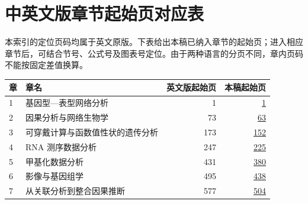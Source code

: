 
\clearpage
{}
\section*{中英文版章节起始页对应表}
本索引的定位页码均属于英文原版。下表给出本稿已纳入章节的起始页；进入相应章节后，可结合节号、公式号及图表号定位。由于两种语言的分页不同，章内页码不能按固定差值换算。

\begin{center}
\small
\begin{tabularx}{\linewidth}{@{}lXrr@{}}
\toprule
章 & 章名 & 英文版起始页 & 本稿起始页\\
\midrule
1 & 基因型—表型网络分析 & 1 & \hyperlink{chapter.1}{1}\\
2 & 因果分析与网络生物学 & 73 & \hyperlink{chapter.2}{63}\\
3 & 可穿戴计算与函数值性状的遗传分析 & 173 & \hyperlink{chapter.3}{152}\\
4 & RNA 测序数据分析 & 247 & \hyperlink{chapter.4}{225}\\
5 & 甲基化数据分析 & 431 & \hyperlink{chapter.5}{380}\\
6 & 影像与基因组学 & 495 & \hyperlink{chapter.6}{438}\\
7 & 从关联分析到整合因果推断 & 577 & \hyperlink{chapter.7}{504}\\
\bottomrule
\end{tabularx}
\end{center}
